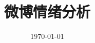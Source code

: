 \documentclass[12pt, oneside]{article}
\title{微博情绪分析}
\date{\today}
\begin{document}
\begin{spacing}{1.5}
\begin{CJK}{UTF8}{gbsn}

\maketitle


\end{CJK}
\end{spacing}
\end{document}
